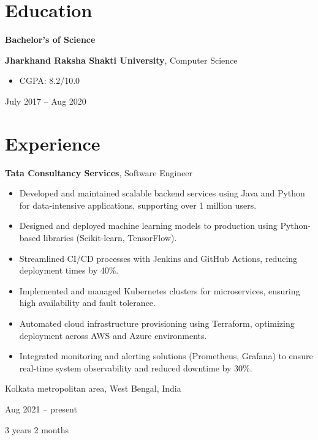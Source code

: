 \documentclass[10pt, letterpaper]{article}
\newenvironment{highlights}{
    \begin{itemize}[
        topsep=0.10 cm,
        parsep=0.10 cm,
        partopsep=0pt,
        itemsep=0pt,
        leftmargin=0.4 cm + 10pt
    ]
}{
    \end{itemize}
} %
\newenvironment{twocolentry}[2][]{
    \onecolentry
    \def\secondColumn{#2}
    \setcolumnwidth{\fill, 4.5 cm}
    \begin{paracol}{2}
}{
    \switchcolumn \raggedleft \secondColumn
    \end{paracol}
    \endonecolentry
} %
\newenvironment{threecolentry}[3][]{
    \onecolentry
    \def\thirdColumn{#3}
    \setcolumnwidth{1 cm, \fill, 4.5 cm}
    \begin{paracol}{3}
    {\raggedright #2} \switchcolumn
}{
    \switchcolumn \raggedleft \thirdColumn
    \end{paracol}
    \endonecolentry
} %
\begin{document}
    
    \section{Education}



        
        \begin{threecolentry}{\textbf{Bachelor's of Science}}{
            July 2017 – Aug 2020
        }
            \textbf{Jharkhand Raksha Shakti University}, Computer Science
            \begin{highlights}
                \item CGPA: 8.2/10.0
            \end{highlights}
        \end{threecolentry}


    
    \section{Experience}



        
        \begin{twocolentry}{
            Kolkata metropolitan area, West Bengal, India

        Aug 2021 – present

        3 years 2 months
        }
            \textbf{Tata Consultancy Services}, Software Engineer
            \begin{highlights}
                \item Developed and maintained scalable backend services using Java and Python for data-intensive applications, supporting over 1 million users.
                \item Designed and deployed machine learning models to production using Python-based libraries (Scikit-learn, TensorFlow).
                \item Streamlined CI/CD processes with Jenkins and GitHub Actions, reducing deployment times by 40\%.
                \item Implemented and managed Kubernetes clusters for microservices, ensuring high availability and fault tolerance.
                \item Automated cloud infrastructure provisioning using Terraform, optimizing deployment across AWS and Azure environments.
                \item Integrated monitoring and alerting solutions (Prometheus, Grafana) to ensure real-time system observability and reduced downtime by 30\%.
            \end{highlights}
        \end{twocolentry}
\end{document}
